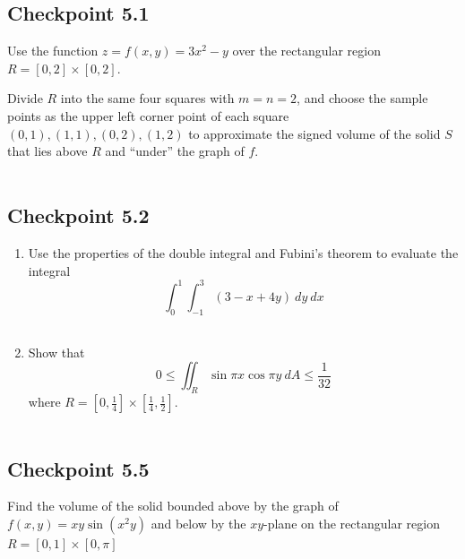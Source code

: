 \documentclass[]{mangos-musings}
\begin{document}
\newpage
\subsection{Checkpoint 5.1}
Use the function $z = f(x, y) = 3x^2 - y$ over the rectangular region $R = [0,2]\times[0,2]$.

Divide $R$ into the same four squares with $m = n = 2$, and choose the sample points as the upper left corner point of each square $(0, 1), (1, 1), (0, 2), (1, 2)$ to approximate the signed volume of the solid $S$ that lies above $R$ and ``under'' the graph of $f$.
\begin{align*}
  \\ \\
\end{align*}
%
%
%
%
\subsection{Checkpoint 5.2}
\begin{enumerate}[label=(\alph*)]
  \item Use the properties of the double integral and Fubini's theorem to evaluate the integral
  \[
    \int_{0}^{1}\int_{-1}^{3} (3 - x + 4y) \ dy \ dx 
  \]
  \begin{align*}
    \\ \\
  \end{align*}
  \item Show that 
  \[
    0 \le \iint_R \sin \pi x \cos \pi y \ dA \le \frac{1}{32}
  \]
  where $R = \left[0, \frac{1}{4}\right]\times \left[\frac{1}{4}, \frac{1}{2}\right]$.
  \begin{align*}
    \\ \\
  \end{align*}
\end{enumerate}
%
%
%
%
\subsection{Checkpoint 5.5}
Find the volume of the solid bounded above by the graph of $f(x, y) = xy\sin (x^2 y)$ and below by the $xy$-plane on the rectangular region $R = [0,1]\times [0, \pi]$ 
\begin{align*}
  \\ \\
\end{align*}
%
%
%
%
\end{document}
